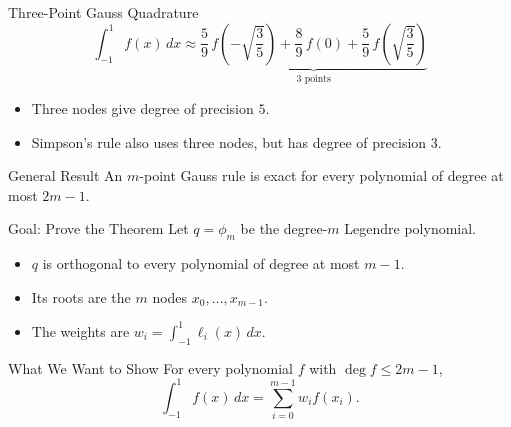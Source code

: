 \documentclass[10pt]{beamer}
\begin{document}
\begin{frame}{Three-Point Gauss Quadrature}
\[
\int_{-1}^{1} f(x)\,dx \approx
\underbrace{
\frac{5}{9}\,f\left(-\sqrt{\frac{3}{5}}\right)
+\frac{8}{9}\,f(0)
+\frac{5}{9}\,f\left(\sqrt{\frac{3}{5}}\right)}_\text{3 points}
\]
\begin{itemize}
    \item Three nodes give degree of precision $5$.
    \item Simpson's rule also uses three nodes, but has degree of precision $3$.
\end{itemize}
\begin{block}{General Result}
An $m$-point Gauss rule is exact for every polynomial of degree at most $2m-1$.
\end{block}
\end{frame}


\begin{frame}{Goal: Prove the Theorem}
Let $q=\phi_m$ be the degree-$m$ Legendre polynomial.
\begin{itemize}
    \item $q$ is orthogonal to every polynomial of degree at most $m-1$.
    \item Its roots are the $m$ nodes $x_0,\ldots,x_{m-1}$.
    \item The weights are $w_i=\displaystyle\int_{-1}^1\ell_i(x)\,dx$.
\end{itemize}
\begin{block}{What We Want to Show}
For every polynomial $f$ with $\deg f\le 2m-1$,
\[
    \int_{-1}^1 f(x)\,dx=\sum_{i=0}^{m-1}w_i f(x_i).
\]
\end{block}
\end{frame}
\end{document}
